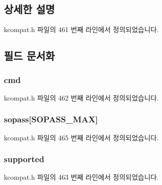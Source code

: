 \subsection{상세한 설명}


kcompat.\+h 파일의 461 번째 라인에서 정의되었습니다.



\subsection{필드 문서화}
\subsubsection[{\texorpdfstring{cmd}{cmd}}]{ cmd}\hypertarget{structethtool__wolinfo_a62fe2a1dbf17d5a8561a5a7f5a97a9ba}{}\label{structethtool__wolinfo_a62fe2a1dbf17d5a8561a5a7f5a97a9ba}


kcompat.\+h 파일의 462 번째 라인에서 정의되었습니다.

\subsubsection[{\texorpdfstring{sopass}{sopass}}]{ sopass\mbox{[}{\bf S\+O\+P\+A\+S\+S\+\_\+\+M\+AX}\mbox{]}}\hypertarget{structethtool__wolinfo_a19b9efa40f1adfcdbc5003b28a3823f1}{}\label{structethtool__wolinfo_a19b9efa40f1adfcdbc5003b28a3823f1}


kcompat.\+h 파일의 465 번째 라인에서 정의되었습니다.

\subsubsection[{\texorpdfstring{supported}{supported}}]{ supported}\hypertarget{structethtool__wolinfo_ab9b31497a07d4762168b1880b3b6b343}{}\label{structethtool__wolinfo_ab9b31497a07d4762168b1880b3b6b343}


kcompat.\+h 파일의 463 번째 라인에서 정의되었습니다.

